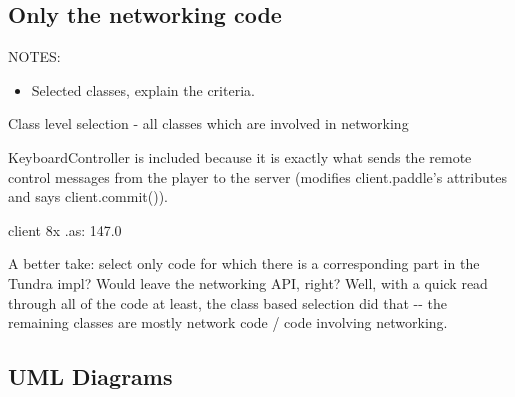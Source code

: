 \documentclass[conference]{IEEEtran}
\begin{document}
\subsection{Only the networking code%
  \label{only-the-networking-code}%
}

NOTES:
%
\begin{itemize}

\item Selected classes, explain the criteria.

\end{itemize}

Class level selection - all classes which are involved in networking

KeyboardController is included because it is exactly what sends the
remote control messages from the player to the server (modifies
client.paddle's attributes and says client.commit()).

client 8x .as: 147.0

A better take: select only code for which there is a corresponding
part in the Tundra impl? Would leave the networking API, right? Well,
with a quick read through all of the code at least, the class based
selection did that -{}- the remaining classes are mostly network code /
code involving networking.


\subsection{UML Diagrams%
  \label{uml-diagrams}%
}
\end{document}
